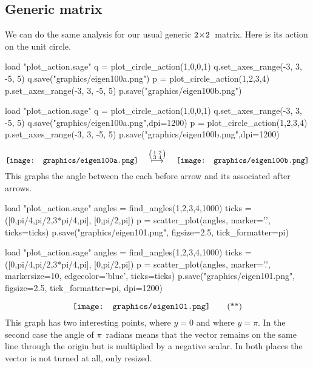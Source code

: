 \subsection{Generic matrix}
We can do the same analysis for our usual generic $2 \! \times \! 2$~matrix.
Here is its action on the unit circle.
\begin{sageoutput}[d,0,4;d,5,7]
load "plot_action.sage"
q = plot_circle_action(1,0,0,1) 
q.set_axes_range(-3, 3, -5, 5) 
q.save("graphics/eigen100a.png")
p = plot_circle_action(1,2,3,4) 
p.set_axes_range(-3, 3, -5, 5) 
p.save("graphics/eigen100b.png")
\end{sageoutput}
\begin{sagesilent}
load "plot_action.sage"
q = plot_circle_action(1,0,0,1) 
q.set_axes_range(-3, 3, -5, 5) 
q.save("graphics/eigen100a.png",dpi=1200)
p = plot_circle_action(1,2,3,4) 
p.set_axes_range(-3, 3, -5, 5) 
p.save("graphics/eigen100b.png",dpi=1200)
\end{sagesilent}
\begin{equation*}
  \vcenteredhbox{\texttt{[image: graphics/eigen100a.png]}}
  \quad\mapsunder{\big (\begin{smallmatrix} 1 &2 \\ 3 &4 \end{smallmatrix}\big )}\quad
  \vcenteredhbox{\texttt{[image: graphics/eigen100b.png]}}
\end{equation*}
This graphs the angle between the each before arrow and its associated after
arrows.
\begin{sageoutput}[d,0,1]
load "plot_action.sage"  
angles = find_angles(1,2,3,4,1000)
ticks = ([0,pi/4,pi/2,3*pi/4,pi], [0,pi/2,pi])
p = scatter_plot(angles, marker='.', ticks=ticks)
p.save("graphics/eigen101.png", figsize=2.5, tick_formatter=pi)
\end{sageoutput}
\begin{sagesilent}
load "plot_action.sage"  
angles = find_angles(1,2,3,4,1000)
ticks = ([0,pi/4,pi/2,3*pi/4,pi], [0,pi/2,pi])
p = scatter_plot(angles, marker='.', markersize=10, edgecolor='blue', ticks=ticks)
p.save("graphics/eigen101.png", figsize=2.5, tick_formatter=pi, dpi=1200)
\end{sagesilent}
\begin{equation*}
  \vcenteredhbox{\texttt{[image: graphics/eigen101.png]}}
  \tag{**}
\end{equation*}
This graph has two interesting points, where $y=0$ and where 
$y=\pi$.
In the second case
the angle of $\pi$~radians means that the vector remains on the
same line through the origin but is multiplied by a negative scalar.
In both places the vector is not turned at all, only resized.

